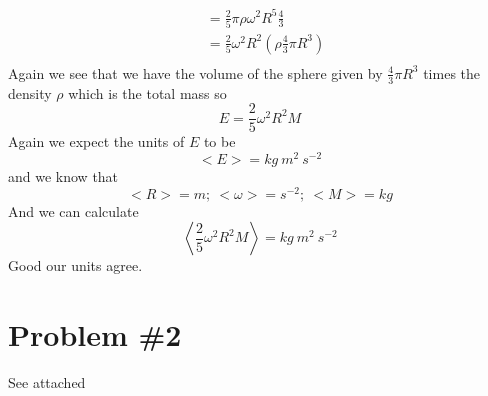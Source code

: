 \documentclass[11pt]{article}
\numberwithin{equation}{section}
\begin{document}
\begin{enumerate}[(a)]
\begin{align*}
&= \frac{2}{5}\pi\rho\omega^2R^5\frac{4}{3}\\
&= \frac{2}{5}\omega^2R^2\left(\rho\frac{4}{3}\pi R^3\right)\\
\end{align*}
Again we see that we have the volume of the sphere given by $\frac{4}{3}\pi R^3$ times the density $\rho$ which is the total mass so
$$E = \frac{2}{5}\omega^2R^2M$$
Again we expect the units of $E$ to be
$$<E> = kg\ m^2\ s^{-2}$$
and we know that
$$<R>=m;\ <\omega>=s^{-2};\ <M>=kg$$
And we can calculate 
$$\left<\frac{2}{5}\omega^2R^2M\right> = kg\ m^2\ s^{-2}$$
Good our units agree.
\end{enumerate}

\section{Problem \#2}
See attached
\end{document}
